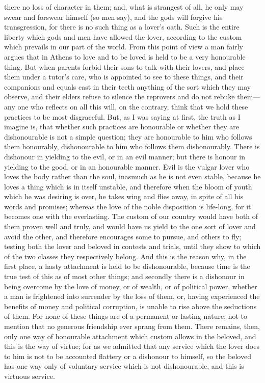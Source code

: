 there no loss of character in them; and, what is strangest of all, he only may swear and forswear himself (so men say), and the gods will forgive his transgression, for there is no such thing as a lover's oath. Such is the entire liberty which gods and men have allowed the lover, according to the custom which prevails in our part of the world. From this point of view a man fairly argues that in Athens to love and to be loved is held to be a very honourable thing. But when parents forbid their sons to talk with their lovers, and place them under a tutor's care, who is appointed to see to these things, and their companions and equals cast in their teeth anything of the sort which they may observe, and their elders refuse to silence the reprovers and do not rebuke them---any one who reflects on all this will, on the contrary, think that we hold these practices to be most disgraceful. But, as I was saying at first, the truth as I imagine is, that whether such practices are honourable or whether they are dishonourable is not a simple question; they are honourable to him who follows them honourably, dishonourable to him who follows them dishonourably. There is dishonour in yielding to the evil, or in an evil manner; but there is honour in yielding to the good, or in an honourable manner. Evil is the vulgar lover who loves the body rather than the soul, inasmuch as he is not even stable, because he loves a thing which is in itself unstable, and therefore when the bloom of youth which he was desiring is over, he takes wing and flies away, in spite of all his words and promises; whereas the love of the noble disposition is life-long, for it becomes one with the everlasting. The custom of our country would have both of them proven well and truly, and would have us yield to the one sort of lover and avoid the other, and therefore encourages some to pursue, and others to fly; testing both the lover and beloved in contests and trials, until they show to which of the two classes they respectively belong. And this is the reason why, in the first place, a hasty attachment is held to be dishonourable, because time is the true test of this as of most other things; and secondly there is a dishonour in being overcome by the love of money, or of wealth, or of political power, whether a man is frightened into surrender by the loss of them, or, having experienced the benefits of money and political corruption, is unable to rise above the seductions of them. For none of these things are of a permanent or lasting nature; not to mention that no generous friendship ever sprang from them. There remains, then, only one way of honourable attachment which custom allows in the beloved, and this is the way of virtue; for as we admitted that any service which the lover does to him is not to be accounted flattery or a dishonour to himself, so the beloved has one way only of voluntary service which is not dishonourable, and this is virtuous service.

